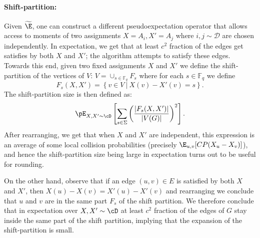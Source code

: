 \paragraph{Shift-partition:}
Given $\widetilde{\E}$, one can construct a different pseudoexpectation operator that allows access 
to moments of two assignments 
$X = A_i, X' = A_j$ where $i,j\sim \mathcal{D}$ are 
chosen independently. 
In expectation, we get that at least $c^2$ fraction of the edges
get satisfies by both $X$ and $X'$; the algorithm attempts 
to satisfy these edges. Towards this end, given two fixed assignments $X$ and $X'$ we define the shift-partition of the vertices of $V$: $V = \cup_{s\in\mathbb{F}_q} F_s$ where for each $s\in\mathbb{F}_q$ we define
\[
F_s(X,X') = \left\{v\in V~|~X(v) - X'(v) = s\right\}.
\]
The shift-partition size is then defined as: 
\[\pE_{X,X' \sim \cD}\left[\sum_{s \in \Sigma} \left(\frac{|F_s(X,X')|}{|V(G)|}\right)^2\right].\]  
After rearranging, we get that when $X$ and $X'$ are independent, this expression is an average of some local collision probabilities (precisely $\E_{u,v}[CP(X_u - X_v)]$), and hence the shift-partition size being large in expectation turns out to be useful for rounding.

On the other hand, observe that if an edge $(u,v)\in E$ is satisfied by both $X$ and 
$X'$, then $X(u) - X(v) = X'(u) - X'(v)$ and rearranging we 
conclude that $u$ and $v$ are in the same part $F_s$ 
of the shift partition. We therefore conclude that in expectation over $X,X' \sim \cD$ at least $c^2$ fraction of the edges of $G$ stay
inside the same part of the shift partition, implying that the expansion of the shift-partition is small. 

